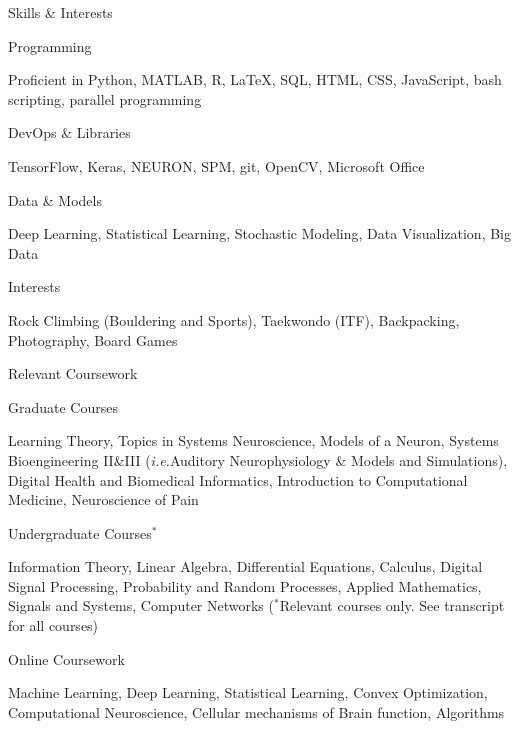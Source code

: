 \documentclass{resume}
\begin{document}
\vspace{1em}

    \begin{rSection}{Skills \& Interests}
\begin{rSubsection}{Programming}{}{}{}
\item Proficient in Python, MATLAB, R, \LaTeX, SQL, HTML, CSS, JavaScript, bash scripting, parallel programming
\end{rSubsection}
\begin{rSubsection}{DevOps \& Libraries}{}{}{}
 \item TensorFlow, Keras, NEURON, SPM, git, OpenCV, Microsoft Office
\end{rSubsection}
\begin{rSubsection}{Data \& Models}{}{}{}
 \item Deep Learning, Statistical Learning, Stochastic Modeling, Data Visualization, Big Data
\end{rSubsection}
\begin{rSubsection}{Interests}{}{}{}
 \item Rock Climbing (Bouldering and Sports), Taekwondo (ITF), Backpacking, Photography, Board Games
\end{rSubsection}
\end{rSection} 

\vspace{1em}

    \begin{rSection}{Relevant Coursework}
\begin{rSubsection}{Graduate Courses}{}{}{}
\item Learning Theory, Topics in Systems Neuroscience, Models of a Neuron, Systems Bioengineering II\&III ({\it i.e.}Auditory Neurophysiology \& Models and Simulations), Digital Health and Biomedical Informatics, Introduction to Computational Medicine, Neuroscience of Pain
\end{rSubsection}
\begin{rSubsection}{Undergraduate Courses$^{*}$}{}{}{}
 \item Information Theory, Linear Algebra, Differential Equations, Calculus, Digital Signal Processing, Probability and Random Processes, Applied Mathematics, Signals and Systems, Computer Networks ($^{*}$Relevant courses only. See transcript for all courses)
\end{rSubsection}
\begin{rSubsection}{Online Coursework}{}{}{}
 \item Machine Learning, Deep Learning, Statistical Learning, Convex Optimization, Computational Neuroscience, Cellular mechanisms of Brain function, Algorithms
\end{rSubsection}
\end{rSection} 
%
%


\end{document}
